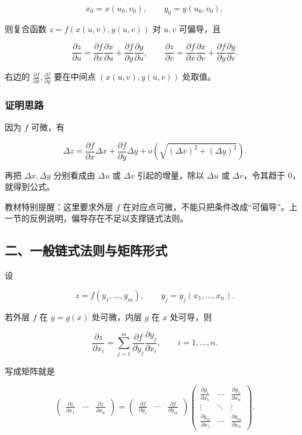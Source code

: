 \[
      x_0=x(u_0,v_0),\qquad y_0=y(u_0,v_0),
    \]

则复合函数 \(z=f(x(u,v),y(u,v))\) 对 \(u,v\) 可偏导，且

\[
      \frac{\partial z}{\partial u}
      =
      \frac{\partial f}{\partial x}\frac{\partial x}{\partial u}
      +
      \frac{\partial f}{\partial y}\frac{\partial y}{\partial u},
      \qquad
      \frac{\partial z}{\partial v}
      =
      \frac{\partial f}{\partial x}\frac{\partial x}{\partial v}
      +
      \frac{\partial f}{\partial y}\frac{\partial y}{\partial v}.
    \]

右边的 \(\frac{\partial f}{\partial x},\frac{\partial f}{\partial y}\) 要在中间点 \((x(u,v),y(u,v))\) 处取值。

\subsubsection*{证明思路}

因为 \(f\) 可微，有

\[
      \Delta z=
      \frac{\partial f}{\partial x}\Delta x
      +
      \frac{\partial f}{\partial y}\Delta y
      +o\!\left(\sqrt{(\Delta x)^2+(\Delta y)^2}\right).
    \]

再把 \(\Delta x,\Delta y\) 分别看成由 \(\Delta u\) 或 \(\Delta v\) 引起的增量，除以 \(\Delta u\) 或 \(\Delta v\)，令其趋于 \(0\)，就得到公式。

\begin{notebox}
教材特别提醒：这里要求外层 \(f\) 在对应点可微，不能只把条件改成“可偏导”。上一节的反例说明，偏导存在不足以支撑链式法则。
\end{notebox}

\subsection*{二、一般链式法则与矩阵形式}

设

\[
      z=f(y_1,\ldots,y_m),\qquad
      y_j=y_j(x_1,\ldots,x_n).
    \]

若外层 \(f\) 在 \(y=g(x)\) 处可微，内层 \(g\) 在 \(x\) 处可导，则

\[
      \frac{\partial z}{\partial x_i}
      =
      \sum_{j=1}^{m}
      \frac{\partial f}{\partial y_j}
      \frac{\partial y_j}{\partial x_i},
      \qquad i=1,\ldots,n.
    \]

写成矩阵就是

\[
      \begin{pmatrix}
      \frac{\partial z}{\partial x_1}&\cdots&\frac{\partial z}{\partial x_n}
      \end{pmatrix}
      =
      \begin{pmatrix}
      \frac{\partial f}{\partial y_1}&\cdots&\frac{\partial f}{\partial y_m}
      \end{pmatrix}
      \begin{pmatrix}
      \frac{\partial y_1}{\partial x_1}&\cdots&\frac{\partial y_1}{\partial x_n}\\
      \vdots&\ddots&\vdots\\
      \frac{\partial y_m}{\partial x_1}&\cdots&\frac{\partial y_m}{\partial x_n}
      \end{pmatrix}.
    \]

